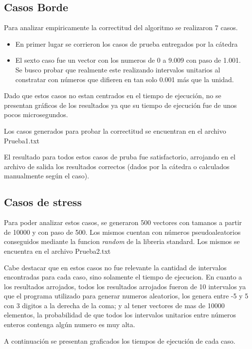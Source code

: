 \documentclass[a4paper, 12pt] {article}
\begin{document}
\subsection*{Casos Borde}
Para analizar empiricamente la correctitud del algoritmo se realizaron 7 casos.

\begin{itemize}
\item En primer lugar se corrieron los casos de prueba entregados por la c\'atedra
\item El sexto caso fue un vector con los numeros de 0 a 9.009 con paso de 1.001. Se busco probar que realmente este realizando intervalos unitarios al constratar con n\'umeros que difieren en tan solo 0.001 m\'as que la unidad.
\end{itemize}

Dado que estos casos no estan centrados en el tiempo de ejecuci\'on, no se presentan gr\'aficos de los resultados ya que su tiempo de ejecuci\'on fue de unos pocos microsegundos. 

Los casos generados para probar la correctitud se encuentran en el archivo Prueba1.txt

El resultado para todos estos casos de pruba fue satisfactorio, arrojando en el archivo de salida los resultados correctos (dados por la c\'atedra o calculados manualmente seg\'un el caso).


\subsection*{Casos de stress}
Para poder analizar estos casos, se generaron 500 vectores con tamanos a partir de 10000 y con paso de 500. Los mismos cuentan con n\'umeros pseudoaleatorios conseguidos mediante la funcion \emph{random} de la libreria standard.
Los mismos se encuentra en el archivo Prueba2.txt

Cabe destacar que en estos casos no fue relevante la cantidad de intervalos encontradas para cada caso, sino solamente el tiempo de ejecucion. En cuanto a los resultados arrojados, todos los resultados arrojados fueron de 10 intervalos ya que el programa utilizado para generar numeros aleatorios, los genera entre -5 y 5 con 3 digitos a la derecha de la coma; y al tener vectores de mas de 10000 elementos, la probabilidad de que todos los intervalos unitarios entre n\'umeros enteros contenga alg\'un numero es muy alta.

A continuaci\'on se presentan graficados los tiempos de ejecuci\'on de cada caso.
\end{document}

